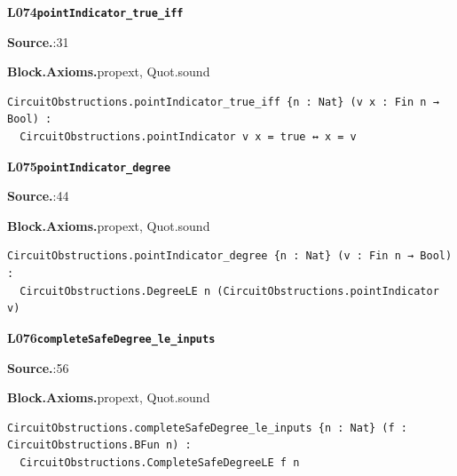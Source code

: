 \par\medskip\noindent\begin{minipage}{\textwidth}
{\small\bfseries L074\enspace\texttt{pointIndicator\_true\_iff}\par}
{\footnotesize\raggedright\textbf{Source.}\enspace{}:31\par
\textbf{Block.}\quad\textbf{Axioms.}\enspace propext, Quot.sound\par}\nopagebreak
\begin{lstlisting}
CircuitObstructions.pointIndicator_true_iff {n : Nat} (v x : Fin n → Bool) :
  CircuitObstructions.pointIndicator v x = true ↔ x = v
\end{lstlisting}
\end{minipage}\par

\par\medskip\noindent\begin{minipage}{\textwidth}
{\small\bfseries L075\enspace\texttt{pointIndicator\_degree}\par}
{\footnotesize\raggedright\textbf{Source.}\enspace{}:44\par
\textbf{Block.}\quad\textbf{Axioms.}\enspace propext, Quot.sound\par}\nopagebreak
\begin{lstlisting}
CircuitObstructions.pointIndicator_degree {n : Nat} (v : Fin n → Bool) :
  CircuitObstructions.DegreeLE n (CircuitObstructions.pointIndicator v)
\end{lstlisting}
\end{minipage}\par

\par\medskip\noindent\begin{minipage}{\textwidth}
{\small\bfseries L076\enspace\texttt{completeSafeDegree\_le\_inputs}\par}
{\footnotesize\raggedright\textbf{Source.}\enspace{}:56\par
\textbf{Block.}\quad\textbf{Axioms.}\enspace propext, Quot.sound\par}\nopagebreak
\begin{lstlisting}
CircuitObstructions.completeSafeDegree_le_inputs {n : Nat} (f : CircuitObstructions.BFun n) :
  CircuitObstructions.CompleteSafeDegreeLE f n
\end{lstlisting}
\end{minipage}\par

